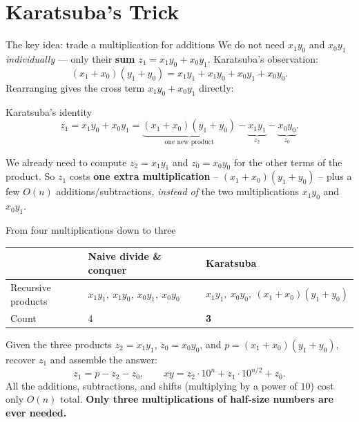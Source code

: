 \documentclass[11pt,aspectratio=169]{beamer}
\begin{document}
\section{Karatsuba's Trick}

\begin{frame}{The key idea: trade a multiplication for additions}
  We do not need $x_1y_0$ and $x_0y_1$ \emph{individually} --- only their \textbf{sum}
  $z_1 = x_1y_0 + x_0y_1$. Karatsuba's observation:
  \[
    (x_1 + x_0)(y_1 + y_0) = x_1y_1 + x_1y_0 + x_0y_1 + x_0y_0.
  \]
  Rearranging gives the cross term $x_1y_0 + x_0y_1$ directly:
  \begin{block}{Karatsuba's identity}
    \[
      z_1 = x_1y_0 + x_0y_1 = \underbrace{(x_1+x_0)(y_1+y_0)}_{\text{one new product}} -
      \underbrace{x_1y_1}_{z_2} - \underbrace{x_0y_0}_{z_0}.
    \]
  \end{block}
  We already need to compute $z_2 = x_1y_1$ and $z_0 = x_0y_0$ for the other terms of the
  product. So $z_1$ costs \textbf{one extra multiplication} --
  $(x_1+x_0)(y_1+y_0)$ -- plus a few $O(n)$ additions/subtractions, \emph{instead of} the
  two multiplications $x_1y_0$ and $x_0y_1$.
\end{frame}

\begin{frame}{From four multiplications down to three}
  \begin{center}
  \begin{tabular}{@{}lll@{}}
    \toprule
    & Naive divide \& conquer & Karatsuba \\
    \midrule
    Recursive products & $x_1y_1,\ x_1y_0,\ x_0y_1,\ x_0y_0$ & $x_1y_1,\ x_0y_0,\ (x_1{+}x_0)(y_1{+}y_0)$ \\
    Count & 4 & \textbf{3} \\
    \bottomrule
  \end{tabular}
  \end{center}
  \vspace{1em}
  Given the three products $z_2 = x_1y_1$, $z_0 = x_0y_0$, and
  $p = (x_1+x_0)(y_1+y_0)$, recover $z_1$ and assemble the answer:
  \[
    z_1 = p - z_2 - z_0, \qquad
    xy = z_2 \cdot 10^{n} + z_1 \cdot 10^{n/2} + z_0.
  \]
  All the additions, subtractions, and shifts (multiplying by a power of $10$) cost only
  $O(n)$ total. \textbf{Only three multiplications of half-size numbers are ever needed.}
\end{frame}
\end{document}
